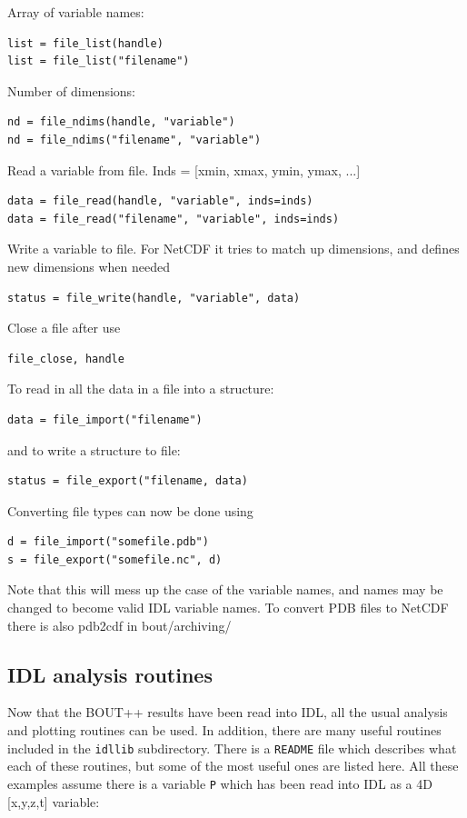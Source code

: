 \documentclass[12pt]{article}
\newcommand{\code}[1]{\texttt{#1}}
\begin{document}
Array of variable names:
\begin{verbatim}
list = file_list(handle)
list = file_list("filename")
\end{verbatim}

Number of dimensions:
\begin{verbatim}
nd = file_ndims(handle, "variable")
nd = file_ndims("filename", "variable")
\end{verbatim}

Read a variable from file. Inds = [xmin, xmax, ymin, ymax, ...]
\begin{verbatim}
data = file_read(handle, "variable", inds=inds)
data = file_read("filename", "variable", inds=inds)
\end{verbatim}

Write a variable to file. For NetCDF it tries to match up
dimensions, and defines new dimensions when needed
\begin{verbatim}
status = file_write(handle, "variable", data)
\end{verbatim}

Close a file after use
\begin{verbatim}
file_close, handle
\end{verbatim}

To read in all the data in a file into a structure:
\begin{verbatim}
data = file_import("filename")
\end{verbatim}

and to write a structure to file:
\begin{verbatim}
status = file_export("filename, data)
\end{verbatim}

Converting file types can now be done using
\begin{verbatim}
d = file_import("somefile.pdb")
s = file_export("somefile.nc", d)
\end{verbatim}

Note that this will mess up the case of the variable names,
and names may be changed to become valid IDL variable names.
To convert PDB files to NetCDF there is also pdb2cdf in bout/archiving/

\subsection{IDL analysis routines}

Now that the BOUT++ results have been read into IDL, all the usual analysis 
and plotting routines can be used. In addition, there are many useful routines
included in the \texttt{idllib} subdirectory. There is a \texttt{README}
file which describes what each of these routines, but some of the most useful
ones are listed here. All these examples assume there is a variable \code{P}
which has been read into IDL as a 4D [x,y,z,t] variable:
\end{document}
